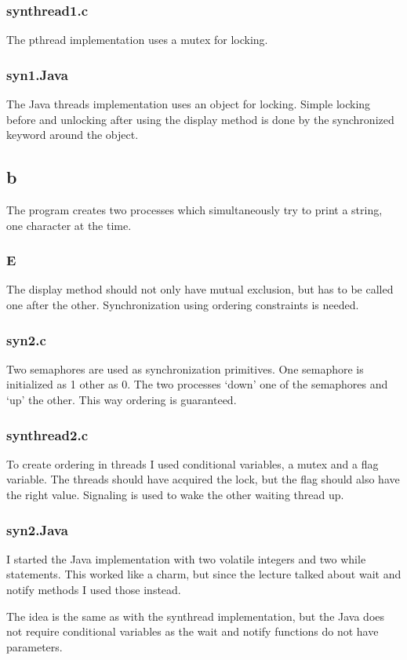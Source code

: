 \documentclass[10pt,a4paper]{article}
\begin{document}
\subsubsection{synthread1.c}
The pthread implementation uses a mutex for locking.

\subsubsection{syn1.Java}
The Java threads implementation uses an object for locking. Simple locking before and unlocking after using the display method is done by the synchronized keyword around the object.

\subsection{b}
The program creates two processes which simultaneously try to print a string, one character at the time.

\subsubsection{E}
The display method should not only have mutual exclusion, but has to be called one after the other. Synchronization using ordering constraints is needed. 

\subsubsection{syn2.c}
Two semaphores are used as synchronization primitives. One semaphore is initialized as 1 other as 0. The two processes `down' one of the semaphores and `up' the other. This way ordering is guaranteed.

\subsubsection{synthread2.c}
To create ordering in threads I used conditional variables, a mutex and a flag variable. The threads should have acquired the lock, but the flag should also have the right value. Signaling is used to wake the other waiting thread up.

\subsubsection{syn2.Java}
I started the Java implementation with two volatile integers and two while statements. This worked like a charm, but since the lecture talked about     wait and notify methods I used those instead.

The idea is the same as with the synthread implementation, but the Java does not require conditional variables as the wait and notify functions do not have parameters.
\end{document}
